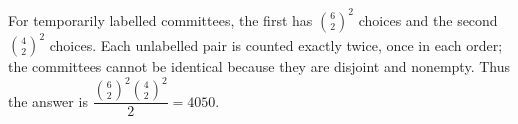 For temporarily labelled committees, the first has $\binom62^2 $ choices and the second $\binom42^2 $ choices. Each unlabelled pair is counted exactly twice, once in each order; the committees cannot be identical because they are disjoint and nonempty. Thus the answer is $\boxed{\dfrac{\binom62^2\binom42^2}{2}=4050}$.
